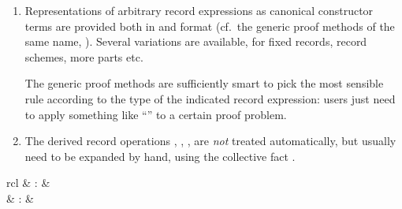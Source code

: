 \begin{isabellebody}
\begin{isamarkuptext}
\begin{enumerate}
  \item Representations of arbitrary record expressions as canonical
  constructor terms are provided both in \hyperlink{method.cases}{\mbox{}} and \hyperlink{method.induct}{\mbox{}} format (cf.\ the generic proof methods of the same name,
  ).  Several variations are available, for
  fixed records, record schemes, more parts etc.

  The generic proof methods are sufficiently smart to pick the most
  sensible rule according to the type of the indicated record
  expression: users just need to apply something like ``'' to a certain proof problem.

  \item The derived record operations , , ,  are \emph{not}
  treated automatically, but usually need to be expanded by hand,
  using the collective fact .

  \end{enumerate}%
\end{isamarkuptext}%
\isamarkuptrue%
%
\isamarkuptrue%
%
\begin{isamarkuptext}%
\begin{matharray}{rcl}
    \hypertarget{command.HOL.datatype}{\hyperlink{command.HOL.datatype}{\mbox{}}} & : &  \\
    \hypertarget{command.HOL.rep-datatype}{\hyperlink{command.HOL.rep-datatype}{\mbox{}}} & : &  \\
  \end{matharray}


\end{isamarkuptext}
\end{isabellebody}
